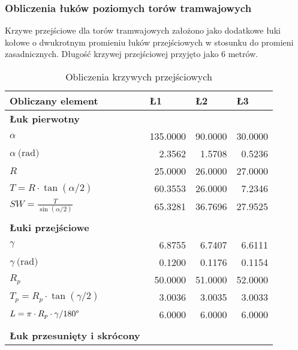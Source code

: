 \documentclass[twoside,12pt]{article}
\begin{document}
		\subsubsection{Obliczenia łuków poziomych torów tramwajowych}
		
		Krzywe przejściowe dla torów tramwajowych założono jako dodatkowe łuki kołowe o dwukrotnym promieniu łuków przejściowych w stosunku do promieni zasadnicznych. Długość krzywej przejściowej przyjęto jako 6 metrów.
		
     \begin{table}[H]
       \centering
       \caption{Obliczenia krzywych przejściowych}
     \begin{tabular}{lrrr}
     \toprule
     Obliczany element & \multicolumn{1}{l}{\textbf{Ł1}} & \multicolumn{1}{l}{\textbf{Ł2}} & \multicolumn{1}{l}{\textbf{Ł3}} \\
     \midrule
     \textbf{Łuk pierwotny} &            &            &  \\
     \midrule
     $\alpha$   & 135.0000   & 90.0000    & 30.0000 \\
     $\alpha \ \text{(rad)}$ & 2.3562     & 1.5708     & 0.5236 \\
     $R$        & 25.0000    & 26.0000    & 27.0000 \\
     $T=R\cdot\tan(\alpha/2)$ & 60.3553    & 26.0000    & 7.2346 \\
     $SW=\frac{T}{\sin(\alpha/2)}$ & 65.3281    & 36.7696    & 27.9525 \\
     \midrule
                &            &            &  \\
     \textbf{Łuki przejściowe} &            &            &  \\
     \midrule
     $\gamma$   & 6.8755     & 6.7407     & 6.6111 \\
     $\gamma \ \text{(rad)}$ & 0.1200     & 0.1176     & 0.1154 \\
     $R_p$      & 50.0000    & 51.0000    & 52.0000 \\
     $T_p=R_p\cdot\tan(\gamma/2)$ & 3.0036     & 3.0035     & 3.0033 \\
     $L=\pi\cdot R_p \cdot \gamma/180\degree$ & 6.0000     & 6.0000     & 6.0000 \\
     \midrule
                &            &            &  \\
     \textbf{Łuk przesunięty i skrócony} &            &            &  \\

\end{tabular}
\end{table}
\end{document}
